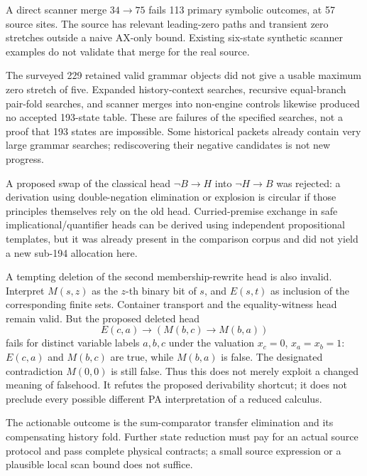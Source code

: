\documentclass[11pt,a4paper]{article}
\begin{document}
A direct scanner merge $34\to75$ fails 113 primary symbolic outcomes,
at 57 source sites. The source has relevant leading-zero paths and
transient zero stretches outside a naive AX-only bound. Existing
six-state synthetic scanner examples do not validate that merge for
the real source.

The surveyed 229 retained valid grammar objects did not give a usable
maximum zero stretch of five. Expanded history-context searches,
recursive equal-branch pair-fold searches, and scanner merges into
non-engine controls likewise produced no accepted 193-state table.
These are failures of the specified searches, not a proof that 193
states are impossible. Some historical packets already contain very
large grammar searches; rediscovering their negative candidates is
not new progress.

A proposed swap of the classical head
$\neg B\to H$ into $\neg H\to B$ was rejected: a derivation using
double-negation elimination or explosion is circular if those principles
themselves rely on the old head. Curried-premise exchange in safe
implicational/quantifier heads can be derived using independent
propositional templates, but it was already present in the comparison
corpus and did not yield a new sub-194 allocation here.

A tempting deletion of the second membership-rewrite head is also
invalid. Interpret $M(s,z)$ as the $z$-th binary bit of $s$, and
$E(s,t)$ as inclusion of the corresponding finite sets. Container
transport and the equality-witness head remain valid. But the proposed
deleted head
\[
 E(c,a)\to(M(b,c)\to M(b,a))
\]
fails for distinct variable labels $a,b,c$ under the valuation
$x_c=0$, $x_a=x_b=1$: $E(c,a)$ and $M(b,c)$ are true, while
$M(b,a)$ is false. The designated contradiction $M(0,0)$ is still false.
Thus this does not merely exploit a changed meaning of falsehood.
It refutes the proposed derivability shortcut; it does not preclude
every possible different PA interpretation of a reduced calculus.

The actionable outcome is the sum-comparator transfer elimination and
its compensating history fold. Further state reduction must pay for
an actual source protocol and pass complete physical contracts; a small
source expression or a plausible local scan bound does not suffice.
\end{document}
